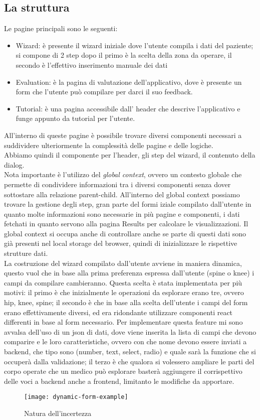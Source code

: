 \subsection{La struttura}
Le pagine principali sono le seguenti:\\ 
\begin{itemize}
\item Wizard: è presente il wizard iniziale dove l'utente compila i dati del paziente; si compone di 2 step dopo il primo è la scelta della zona da operare, il secondo è l'effettivo inserimento manuale dei dati
\item Evaluation: è la pagina di valutazione dell'applicativo, dove è presente un form che l'utente può compilare per darci il suo feedback. 
\item Tutorial: è una pagina accessibile dall' header che descrive l'applicativo e funge appunto da tutorial per l'utente. 
\end{itemize}
All'interno di queste pagine è possibile trovare diversi componenti necessari a suddividere ulteriormente la complessità delle pagine e delle logiche.\\ 
Abbiamo quindi il componente per l'header, gli step del wizard, il contenuto della dialog.\\

Nota importante è l'utilizzo del \textit{global context}, ovvero un contesto globale che permette di condividere informazioni tra i diversi componenti senza dover sottostare alla relazione parent-child. All'interno del global context possiamo trovare la gestione degli step, gran parte del formi iziale compilato dall'utente in quanto molte informazioni sono necessarie in più pagine e componenti, i dati fetchati in quanto servono alla pagina Results per calcolare le visualizzazioni. Il global context si occupa anche di controllare anche se parte di questi dati sono già presenti nel local storage del browser, quindi di inizializzare le rispettive strutture dati.\\

La costruzione del wizard compilato dall'utente avviene in maniera dinamica, questo vuol che in base alla prima preferenza espressa dall'utente (spine o knee) i campi da compilare cambieranno. Questa scelta è stata implementata per più motivi: il primo è che inizialmente le operazioni da esplorare erano tre, ovvero hip, knee, spine; il secondo è che in base alla scelta dell'utente i campi del form erano effettivamente diversi, ed era ridondante utilizzare componenti react differenti in base al form necessario. Per implementare questa feature mi sono avvalsa dell'uso di un json di dati, dove viene inserita la lista di campi che devono comparire e le loro caratteristiche, ovvero con che nome devono essere inviati a backend, che tipo sono (number, text, select, radio) e quale sarà la funzione che si occuperà dalla validazione; il terzo è che qualora si volessero ampliare le parti del corpo operate che un medico può esplorare basterà aggiungere il corrispettivo delle voci a backend anche a frontend, limitanto le modifiche da apportare. 

\begin{figure}[!ht] 
    \centering 
    \texttt{[image: dynamic-form-example]} 
    \caption{Natura dell'incertezza}
\end{figure}


